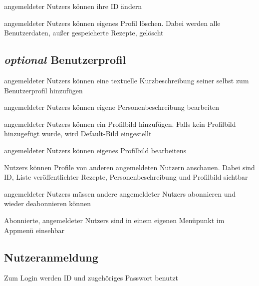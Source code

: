	\Glspl{angemeldeter Nutzer} können ihre \gls{ID} ändern

	
	\Glspl{angemeldeter Nutzer} können eigenes Profil löschen. Dabei werden alle Benutzerdaten, außer gespeicherte Rezepte, gelöscht
		
	\subsection{{\em optional} Benutzerprofil}
	
	\Glspl{angemeldeter Nutzer} können eine textuelle Kurzbeschreibung seiner selbst zum Benutzerprofil hinzufügen

	\Glspl{angemeldeter Nutzer} können eigene Personenbeschreibung bearbeiten

	\Glspl{angemeldeter Nutzer} können ein Profilbild hinzufügen. Falls kein Profilbild hinzugefügt wurde, wird Default-Bild eingestellt
	
	\Glspl{angemeldeter Nutzer} können eigenes Profilbild \glspl{bearbeiten}
	
	\Glspl{Nutzer} können Profile von anderen angemeldeten Nutzern anschauen. Dabei sind ID, Liste veröffentlichter Rezepte, Personenbeschreibung und Profilbild sichtbar
	
	\Glspl{angemeldeter Nutzer} müssen andere \glspl{angemeldeter Nutzer} abonnieren und wieder deabonnieren können
	
	Abonnierte, \glspl{angemeldeter Nutzer} sind in einem eigenen Menüpunkt im Appmenü einsehbar
	

	\subsection{Nutzeranmeldung}
	
	Zum Login werden \gls{ID} und zugehöriges Passwort benutzt
	

